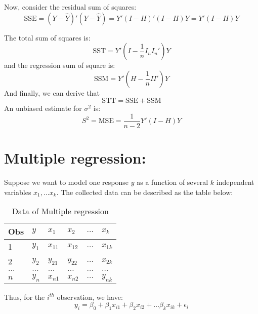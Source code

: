 \documentclass[11pt]{article}
\begin{document}
Now, consider the residual sum of squares:
\begin{equation}\label{eq: RSS-matrix}
	\text{SSE} = (Y - \hat{Y})'(Y - \hat{Y}) = Y'(I - H)' (I - H) Y = Y' (I - H) Y
\end{equation}

The total sum of squares is:
\begin{equation}\label{eq: SST-matrix}
 	\text{SST} = Y' \left(I - \dfrac{1}{n} I_n I_n'\right) Y
\end{equation}
and the regression sum of square is:
\begin{equation}
	\text{SSM} = Y' \left(H - \dfrac{1}{n} I I'\right)Y
\end{equation}
And finally, we can derive that
$$\text{STT} = \text{SSE} + \text{SSM} $$
An unbiased estimate for $\sigma^2$ is:
\begin{equation}\label{eq: s2-matrix}
	S^2 = \text{MSE} = \dfrac{1}{n - 2} Y' (I - H) Y
\end{equation}


\section{Multiple regression: }
Suppose we want to model one response $y$ as a function of several $k$ independent variables $x_1, \dots x_k$.
The collected data can be described as the table below: 
	\begin{table}[h]
		\centering
		\begin{tabular}{p{1.5cm} | p{1.5cm}| p{1.5cm} p{1.5cm} p{1.5cm} p{1.5cm}| } 
			Obs & $y$ & $x_1$ & $x_2$ & $\dots$ & $x_k$ \\
			\hline
			1 & $y_1$ & $x_{11}$ & $x_{12}$ & $\dots $ & $x_{1k}$ \\
			2 &  $y_2$ & $y_{21} $ & $y_{22}$ & $\dots $ &  $x_{2k}$ \\
			$\dots$ & $\dots$ & $\dots$ &$\dots$ &$\dots$ & $\dots$ \\
			$n$ & $y_n$ & $x_{n1}$ & $x_{n2} $ & $\dots $ & $y_{nk}$  
		\end{tabular}
		\caption{Data of Multiple regression}
		\label{table: mul-reg}
	\end{table}

Thus, for the $i^{th}$ observation, we have:
$$y_i = \beta_0 + \beta_1x_{i1} + \beta_2 x_{i2} + \dots \beta_{k} x_{ik} + \epsilon_i $$
\end{document}
